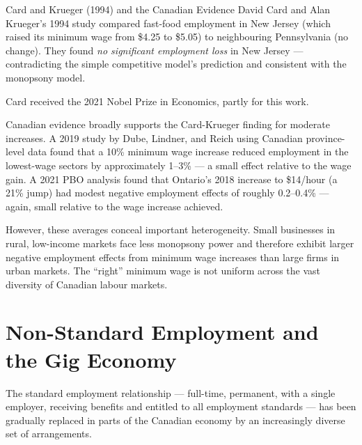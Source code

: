 \begin{canexample}{Card and Krueger (1994) and the Canadian Evidence}
David Card and Alan Krueger's 1994 study compared fast-food employment
in New Jersey (which raised its minimum wage from \$4.25 to \$5.05) to
neighbouring Pennsylvania (no change). They found \textit{no significant
employment loss} in New Jersey --- contradicting the simple competitive
model's prediction and consistent with the monopsony model.

Card received the 2021 Nobel Prize in Economics, partly for this work.

Canadian evidence broadly supports the Card-Krueger finding for moderate
increases. A 2019 study by Dube, Lindner, and Reich using Canadian
province-level data found that a 10\% minimum wage increase reduced
employment in the lowest-wage sectors by approximately 1--3\% ---
a small effect relative to the wage gain. A 2021 PBO analysis found
that Ontario's 2018 increase to \$14/hour (a 21\% jump) had modest
negative employment effects of roughly 0.2--0.4\% --- again, small
relative to the wage increase achieved.

However, these averages conceal important heterogeneity. Small businesses
in rural, low-income markets face less monopsony power and therefore
exhibit larger negative employment effects from minimum wage increases
than large firms in urban markets. The ``right'' minimum wage is not
uniform across the vast diversity of Canadian labour markets.
\end{canexample}

\section{Non-Standard Employment and the Gig Economy}
\label{sec:nonstandard}

The standard employment relationship --- full-time, permanent, with a single
employer, receiving benefits and entitled to all employment standards --- has
been gradually replaced in parts of the Canadian economy by an increasingly
diverse set of  arrangements.

